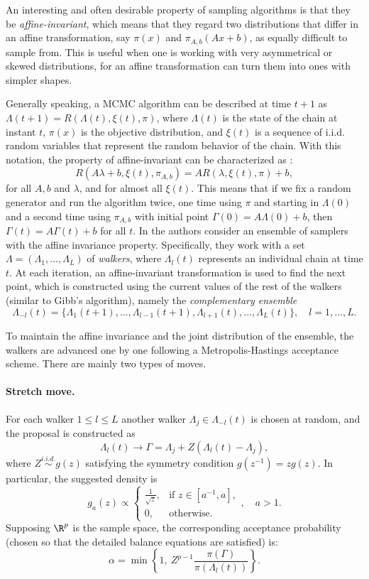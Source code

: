 An interesting and often desirable property of sampling algorithms is that they be \textit{affine-invariant}, which means that they regard two distributions that differ in an affine transformation, say \(\pi(x)\) and \(\pi_{A, b}(Ax + b)\), as equally difficult to sample from. This is useful when one is working with very asymmetrical or skewed distributions, for an affine transformation can turn them into ones with simpler shapes.

Generally speaking, a MCMC algorithm can be described at time \(t+1\) as \(\Lambda(t+1)=R(\Lambda(t), \xi(t), \pi)\), where \(\Lambda(t)\) is the state of the chain at instant \(t\), \(\pi(x)\) is the objective distribution, and \(\xi(t)\) is a sequence of i.i.d. random variables that represent the random behavior of the chain. With this notation, the property of affine-invariant can be characterized as \citep{goodman2010ensemble}:
 \[
 R(A\lambda+b, \xi(t), \pi_{A,b}) = AR(\lambda, \xi(t), \pi) + b,
 \]
 for all \(A,b\) and \(\lambda\), and for almost all \(\xi(t)\). This means that if we fix a random generator and run the algorithm twice, one time using \(\pi\) and starting in \(\Lambda(0)\) and a second time using \(\pi_{A,b}\) with initial point \(\Gamma(0)=A\Lambda(0)+b\), then \(\Gamma(t)=A\Gamma(t)+b\) for all \(t\). In \citep{goodman2010ensemble} the authors consider an ensemble of samplers with the affine invariance property. Specifically, they work with a set \(\Lambda=(\Lambda_1, \dots, \Lambda_L)\) of \textit{walkers}, where \(\Lambda_l(t)\) represents an individual chain at time \(t\). At each iteration, an affine-invariant transformation is used to find the next point, which is constructed using the current values of the rest of the walkers (similar to Gibb's algorithm), namely the \textit{complementary ensemble}
 \[
  \Lambda_{-l}(t) = \{\Lambda_1(t+1), \dots, \Lambda_{l-1}(t+1), \Lambda_{l+1}(t), \dots, \Lambda_L(t)\}, \quad l=1,\dots, L.
  \]

To maintain the affine invariance and the joint distribution of the ensemble, the walkers are advanced one by one following a Metropolis-Hastings acceptance scheme. There are mainly two types of moves.

  \paragraph{Stretch move.} For each walker \(1\leq l \leq L\) another walker \(\Lambda_j \in \Lambda_{-l}(t)\) is chosen at random, and the proposal is constructed as
  \[
    \Lambda_l(t) \to \Gamma = \Lambda_j + Z(\Lambda_l(t) - \Lambda_j),
  \]
  where \(Z \stackrel{i.i.d.}{\sim} g(z)\) satisfying the symmetry condition \(g(z^{-1})=zg(z)\). In particular, the suggested density is
  \[
  g_a(z) \propto \begin{cases}
    \frac{1}{\sqrt{z}}, & \text{if } z \in [a^{-1}, a],\\
    0, & \text{otherwise.}
\end{cases}, \quad a > 1.
  \]
Supposing \(\R^p\) is the sample space, the corresponding acceptance probability (chosen so that the detailed balance equations are satisfied) is:
  \[
    \alpha = \min\left\{1, \ Z^{p-1}\frac{\pi(\Gamma)}{\pi(\Lambda_l(t))}\right\}.
  \]

